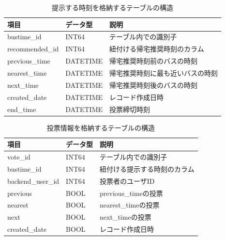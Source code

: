\begin{table}[htb]
  \centering
  \caption{提示する時刻を格納するテーブルの構造}
  \label{tab:bustime}
  \begin{tabular}{|l|l|l|}
    \hline
    \textbf{項目}     & \textbf{データ型} & \textbf{説明}      \\
    \hline
    bustime\_id     & INT64         & テーブル内での識別子       \\
    recommended\_id & INT64         & 紐付ける帰宅推奨時刻のカラム   \\
    previous\_time  & DATETIME      & 帰宅推奨時刻前のバスの時刻    \\
    nearest\_time   & DATETIME      & 帰宅推奨時刻に最も近いバスの時刻 \\
    next\_time      & DATETIME      & 帰宅推奨時刻後のバスの時刻    \\
    created\_date   & DATETIME      & レコード作成日時         \\
    end\_time       & DATETIME      & 投票締切時刻           \\
    \hline
  \end{tabular}
\end{table}

\begin{table}[htb]
  \centering
  \caption{投票情報を格納するテーブルの構造}
  \label{tab:vote}
  \begin{tabular}{|l|l|l|}
    \hline
    \textbf{項目}       & \textbf{データ型} & \textbf{説明}       \\
    \hline
    vote\_id          & INT64         & テーブル内での識別子        \\
    bustime\_id       & INT64         & 紐付ける提示する時刻のカラム    \\
    backend\_user\_id & INT64         & 投票者のユーザID         \\
    previous          & BOOL          & previous\_timeの投票 \\
    nearest           & BOOL          & nearest\_timeの投票  \\
    next              & BOOL          & next\_timeの投票     \\
    created\_date     & BOOL          & レコード作成日時          \\
    \hline
  \end{tabular}
\end{table}

